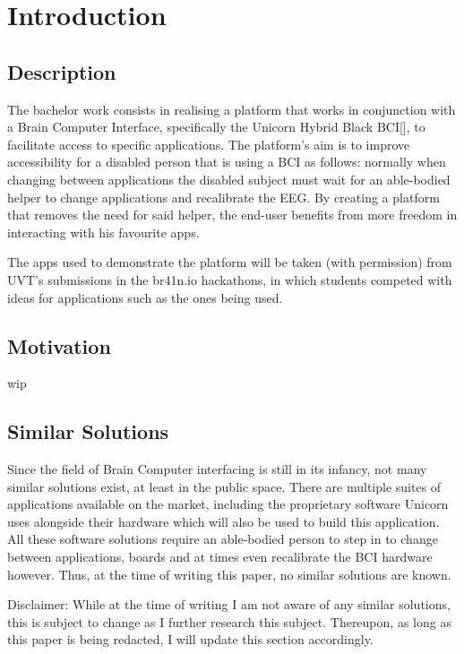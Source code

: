 
\chapter{Introduction}\label{cap:intro}

\section{Description}\label{sect:description}
\hspace{\parindent} The bachelor work consists in realising a platform that works in conjunction with a Brain Computer Interface, specifically the Unicorn Hybrid Black BCI[], to facilitate access to specific applications. The platform's aim is to improve accessibility for a disabled person that is using a BCI as follows: normally when changing between applications the disabled subject must wait for an able-bodied helper to change applications and recalibrate the EEG. By creating a platform that removes the need for said helper, the end-user benefits from more freedom in interacting with his favourite apps. 

\vspace*{2mm}
\hspace{\parindent} The apps used to demonstrate the platform will be taken (with permission) from UVT's submissions in the br41n.io hackathons, in which students competed with ideas for applications such as the ones being used.


\section{Motivation}\label{sect:motivation}
\hspace{\parindent} wip


\section{Similar Solutions}\label{sect:similar solutions}
\hspace{\parindent} Since the field of Brain Computer interfacing is still in its infancy, not many similar solutions exist, at least in the public space. There are multiple suites of applications available on the market, including the proprietary software Unicorn uses alongside their hardware which will also be used to build this application. All these software solutions require an able-bodied person to step in to change between applications, boards and at times even recalibrate the BCI hardware however. Thus, at the time of writing this paper, no similar solutions are known.

\hspace{\parindent} Disclaimer: While at the time of writing I am not aware of any similar solutions, this is subject to change as I further research this subject. Thereupon, as long as this paper is being redacted, I will update this section accordingly.
